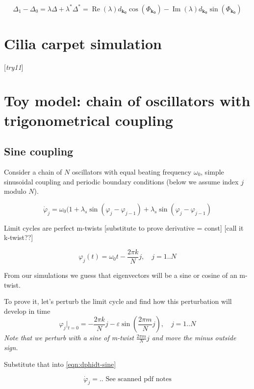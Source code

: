 \documentclass[a4paper,12pt]{article}
\newcommand{\eps}{\varepsilon}
\newcommand{\D}{\Delta}%
\begin{document}
$$
\D_1 - \D_0 = \lambda \D + \lambda^* \D^* = \operatorname{Re}(\lambda)d_{\mathbf{k_0}} \cos(\Phi_{\mathbf{k_0}}) - \operatorname{Im}(\lambda)  d_{\mathbf{k_0}} \sin(\Phi_{\mathbf{k_0}})
$$


\section*{Cilia carpet simulation}
[\textit{try11}]




\section*{Toy model: chain of oscillators with trigonometrical coupling}
\newcommand{\fr}[2]{\frac{2 \pi #1} {N} #2 } %
\newcommand{\si}[2]{\sin \left( \fr{#1}{#2} \right)} %
\newcommand{\co}[2]{\sin \left( \fr{#1}{#2} \right)} 
\newcommand{\ex}[2]{e ^{i \fr{#1}{#2}}}


\subsection*{Sine coupling}


Consider a chain of $N$ oscillators with equal beating frequency $\omega_0$, simple sinusoidal coupling and periodic boundary conditions (below we assume index $j$ modulo $N$).

\begin{equation}
\dot \varphi_j = \omega_0 ( 1 + \lambda_s \sin(\varphi_j - \varphi_{j-1})
+ \lambda_s \sin(\varphi_j - \varphi_{j-1})
\label{eqn:dphidt-sine}
\end{equation}

Limit cycles are perfect m-twists [substitute to prove derivative = const] [call it k-twist??]

$$
\varphi_j(t) = \omega_0 t - \fr{k}{j}, \quad j=1..N
$$

From our simulations we guess that eigenvectors will be a sine or cosine of an m-twist.

To prove it, let's perturb the limit cycle and find how this perturbation will develop in time
$$
\varphi_j \big\rvert_{t=0} = - \fr{k}{j} -  \eps \si{m}{j}, \quad j=1..N
$$
\textit{Note that we perturb with a sine of m-twist $\fr{m}{j}$ and move the minus outside sign.
}

Substitute that into \eqref{eqn:dphidt-sine}

\begin{equation}
\dot \varphi_j = .. \text{  See scanned pdf notes}
\end{equation}
\end{document}
